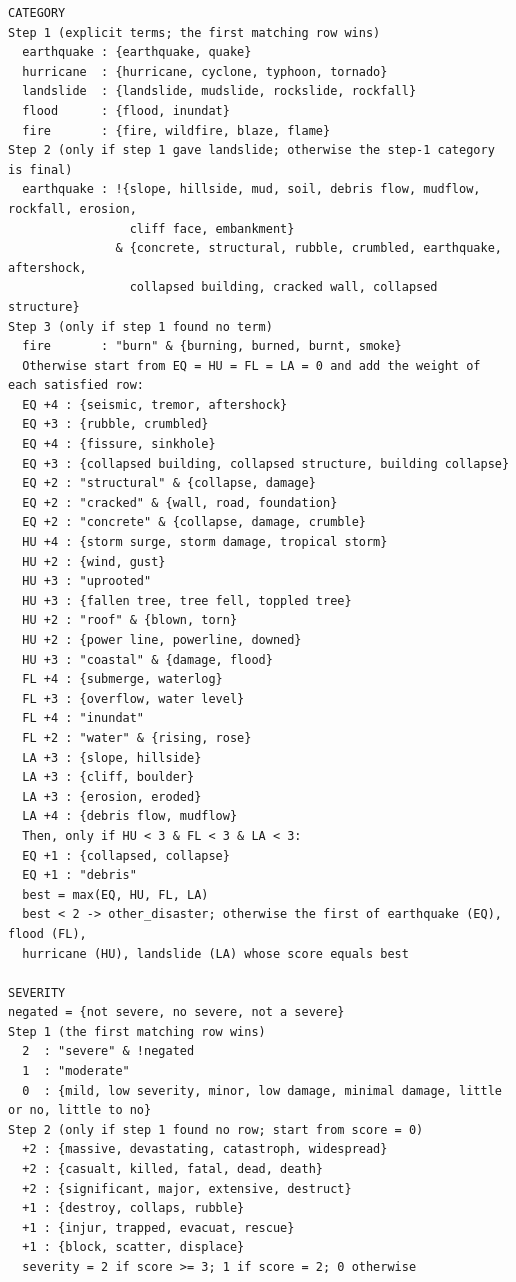\begin{lstlisting}[style=reviewprompt]
CATEGORY
Step 1 (explicit terms; the first matching row wins)
  earthquake : {earthquake, quake}
  hurricane  : {hurricane, cyclone, typhoon, tornado}
  landslide  : {landslide, mudslide, rockslide, rockfall}
  flood      : {flood, inundat}
  fire       : {fire, wildfire, blaze, flame}
Step 2 (only if step 1 gave landslide; otherwise the step-1 category is final)
  earthquake : !{slope, hillside, mud, soil, debris flow, mudflow, rockfall, erosion,
                 cliff face, embankment}
               & {concrete, structural, rubble, crumbled, earthquake, aftershock,
                 collapsed building, cracked wall, collapsed structure}
Step 3 (only if step 1 found no term)
  fire       : "burn" & {burning, burned, burnt, smoke}
  Otherwise start from EQ = HU = FL = LA = 0 and add the weight of each satisfied row:
  EQ +4 : {seismic, tremor, aftershock}
  EQ +3 : {rubble, crumbled}
  EQ +4 : {fissure, sinkhole}
  EQ +3 : {collapsed building, collapsed structure, building collapse}
  EQ +2 : "structural" & {collapse, damage}
  EQ +2 : "cracked" & {wall, road, foundation}
  EQ +2 : "concrete" & {collapse, damage, crumble}
  HU +4 : {storm surge, storm damage, tropical storm}
  HU +2 : {wind, gust}
  HU +3 : "uprooted"
  HU +3 : {fallen tree, tree fell, toppled tree}
  HU +2 : "roof" & {blown, torn}
  HU +2 : {power line, powerline, downed}
  HU +3 : "coastal" & {damage, flood}
  FL +4 : {submerge, waterlog}
  FL +3 : {overflow, water level}
  FL +4 : "inundat"
  FL +2 : "water" & {rising, rose}
  LA +3 : {slope, hillside}
  LA +3 : {cliff, boulder}
  LA +3 : {erosion, eroded}
  LA +4 : {debris flow, mudflow}
  Then, only if HU < 3 & FL < 3 & LA < 3:
  EQ +1 : {collapsed, collapse}
  EQ +1 : "debris"
  best = max(EQ, HU, FL, LA)
  best < 2 -> other_disaster; otherwise the first of earthquake (EQ), flood (FL),
  hurricane (HU), landslide (LA) whose score equals best

SEVERITY
negated = {not severe, no severe, not a severe}
Step 1 (the first matching row wins)
  2  : "severe" & !negated
  1  : "moderate"
  0  : {mild, low severity, minor, low damage, minimal damage, little or no, little to no}
Step 2 (only if step 1 found no row; start from score = 0)
  +2 : {massive, devastating, catastroph, widespread}
  +2 : {casualt, killed, fatal, dead, death}
  +2 : {significant, major, extensive, destruct}
  +1 : {destroy, collaps, rubble}
  +1 : {injur, trapped, evacuat, rescue}
  +1 : {block, scatter, displace}
  severity = 2 if score >= 3; 1 if score = 2; 0 otherwise
\end{lstlisting}

